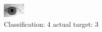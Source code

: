 \begin{figure}[h!]
\begin{center}
\includegraphics[width=0.60\columnwidth]{figures/ID2178_class_4_target_3.png}
\end{center}
\caption{ Classification: 4 actual target: 3}
\label{fig:ID2178_class_4_target_3}
\end{figure}
